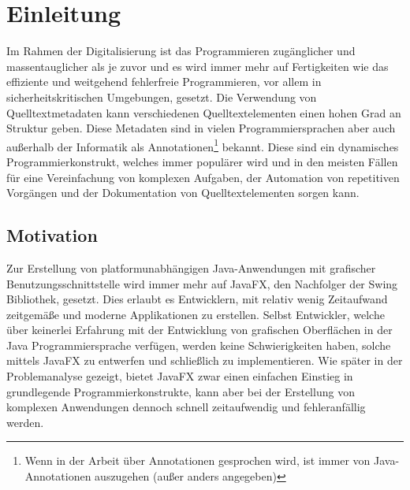 \chapter{Einleitung}
\label{einleitung}
Im Rahmen der Digitalisierung ist das Programmieren zugänglicher und massentauglicher als je zuvor und es wird immer mehr auf Fertigkeiten wie das effiziente und weitgehend fehlerfreie Programmieren, vor allem in sicherheitskritischen Umgebungen, gesetzt. Die Verwendung von Quelltextmetadaten kann verschiedenen Quelltextelementen einen hohen Grad an Struktur geben. Diese Metadaten sind in vielen Programmiersprachen aber auch außerhalb der Informatik als Annotationen\footnote{Wenn in der Arbeit über Annotationen gesprochen wird, ist immer von Java-Annotationen auszugehen (außer anders angegeben)} bekannt. Diese sind ein dynamisches Programmierkonstrukt, welches immer populärer wird und in den meisten Fällen für eine Vereinfachung von komplexen Aufgaben, der Automation von repetitiven Vorgängen und der Dokumentation von Quelltextelementen sorgen kann.
\section{Motivation}
\label{motivation}
Zur Erstellung von platformunabhängigen Java-Anwendungen mit grafischer Benutzungsschnittstelle wird immer mehr auf JavaFX, den Nachfolger der Swing Bibliothek, gesetzt. Dies erlaubt es Entwicklern, mit relativ wenig Zeitaufwand zeitgemäße und moderne Applikationen zu erstellen. Selbst Entwickler, welche über keinerlei Erfahrung mit der Entwicklung von grafischen Oberflächen in der Java Programmiersprache verfügen, werden keine Schwierigkeiten haben, solche mittels JavaFX zu entwerfen und schließlich zu implementieren. Wie später in der Problemanalyse gezeigt, bietet JavaFX zwar einen einfachen Einstieg in grundlegende Programmierkonstrukte, kann aber bei der Erstellung von komplexen Anwendungen dennoch schnell zeitaufwendig und fehleranfällig werden.
